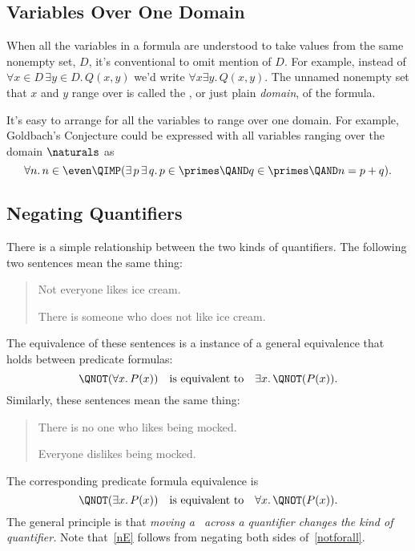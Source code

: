 \subsection{Variables Over One Domain}
When all the variables in a formula are understood to take values from the
same nonempty set, $D$, it's conventional to omit mention of $D$.  For
example, instead of $\forall x \in D\, \exists y \in D.\, Q(x,y)$ we'd
write $\forall x \exists y.\, Q(x,y)$.  The unnamed nonempty set that $x$
and $y$ range over is called the , or just plain
\emph{domain}, of the formula.

It's easy to arrange for all the variables to range over one domain.  For
example, Goldbach's Conjecture could be expressed with all variables
ranging over the domain $\naturals$ as
\[
\forall n.\, n \in \even \QIMP (\exists\, p\, \exists\, q.\, p \in \primes \QAND
q \in \primes \QAND n = p + q).
\]

\subsection{Negating Quantifiers}

There is a simple relationship between the two kinds of quantifiers.  The
following two sentences mean the same thing:
%
\begin{quote}

Not everyone likes ice cream.

There is someone who does not like ice cream.

\end{quote}
The equivalence of these sentences is a instance of a general
equivalence that holds between predicate formulas:
%
\begin{equation}\label{notforall}
\QNOT(\forall x.\, P(x))
\quad \text{is equivalent to} \quad
\exists x.\, \QNOT(P(x)).
\end{equation}
%
Similarly, these sentences mean the same thing:
%
\begin{quote}
There is no one who likes being mocked.

Everyone dislikes being mocked.
\end{quote}
The corresponding predicate formula equivalence is
\begin{equation}\label{nE}
\QNOT(\exists x.\, P(x))
\quad \text{is equivalent to} \quad
\forall x.\, \QNOT(P(x)).
\end{equation}
The general principle is that \emph{moving a \QNOT\ across a
  quantifier changes the kind of quantifier.}  Note that~\eqref{nE}
follows from negating both sides of~\eqref{notforall}.

